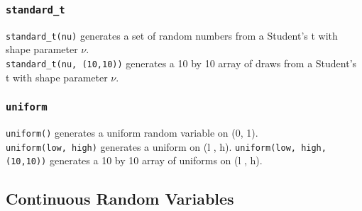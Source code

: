 \documentclass[KSmain.tex]{subfiles}
\begin{document}
\subsubsection{\texttt{standard\_t}}
\texttt{standard\_t(nu)} generates a set of random numbers from a Student’s t with shape parameter $\nu$.\\ \texttt{standard\_t(nu, (10,10))}
generates a 10 by 10 array of draws from a Student’s t with shape parameter $\nu$.
\subsubsection{\texttt{uniform}}
\texttt{uniform()} generates a uniform random variable on (0, 1). \\ \texttt{uniform(low, high)} generates a uniform on
(l , h). \texttt{uniform(low, high, (10,10))} generates a 10 by 10 array of uniforms on (l , h).
\newpage


\subsection{Continuous Random Variables}
\end{document}
